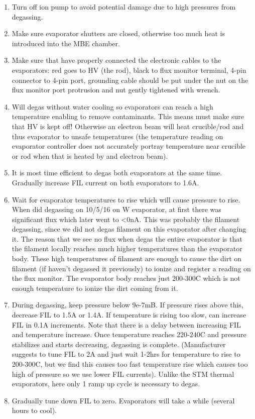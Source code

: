 \begin{enumerate}
\item	Turn off ion pump to avoid potential damage due to high pressures from degassing. 
\item	Make sure evaporator shutters are closed, otherwise too much heat is introduced into the MBE chamber.
\item	Make sure that have properly connected the electronic cables to the evaporators: red goes to HV (the rod), black to flux monitor terminal, 4-pin connector to 4-pin port, grounding cable should be put under the nut on the flux monitor port protrusion and nut gently tightened with wrench.
\item	Will degas without water cooling so evaporators can reach a high temperature enabling to remove contaminants. This means must make sure that HV is kept off! Otherwise an electron beam will heat crucible/rod and thus evaporator to unsafe temperatures (the temperature reading on evaporator controller does not accurately portray temperature near crucible or rod when that is heated by and electron beam).
\item	It is most time efficient to degas both evaporators at the same time. Gradually increase FIL current on both evaporators to 1.6A. 
\item	Wait for evaporator temperatures to rise which will cause pressure to rise. 
When did degassing on 10/5/16 on W evaporator, at first there was significant flux which later went to <0nA. This was probably the filament degassing, since we did not degas filament on this evaporator after changing it. The reason that we see no flux when degas the entire evaporator is that the filament locally reaches much higher temperatures than the evaporator body. These high temperatures of filament are enough to cause the dirt on filament (if haven’t degassed it previously) to ionize and register a reading on the flux monitor. The evaporator body reaches just 200-300C which is not enough temperature to ionize the dirt coming from it.
\item	During degassing, keep pressure below 9e-7mB. If pressure rises above this, decrease FIL to 1.5A or 1.4A. If temperature is rising too slow, can increase FIL in 0.1A increments. Note that there is a delay between increasing FIL and temperature increase. Once temperature reaches 220-240C and pressure stabilizes and starts decreasing, degassing is complete. (Manufacturer suggests to tune FIL to 2A and just wait 1-2hrs for temperature to rise to 200-300C, but we find this causes too fast temperature rise which causes too high of pressure so we use lower FIL currents). Unlike the STM thermal evaporators, here only 1 ramp up cycle is necessary to degas.
\item	Gradually tune down FIL to zero. Evaporators will take a while (several hours to cool).
\end{enumerate}


